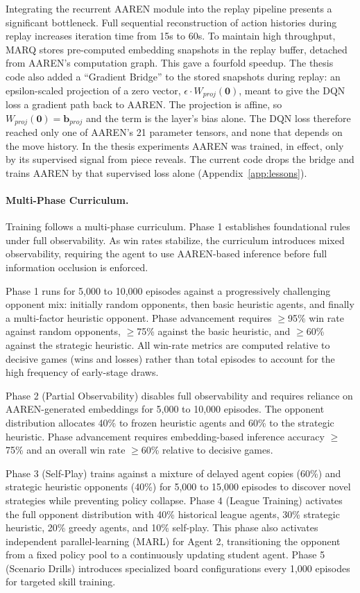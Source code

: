 Integrating the recurrent AAREN module into the replay pipeline presents a significant bottleneck. Full sequential reconstruction of action histories during replay increases iteration time from 15s to 60s. To maintain high throughput, MARQ stores pre-computed embedding snapshots in the replay buffer, detached from AAREN's computation graph. This gave a fourfold speedup. The thesis code also added a ``Gradient Bridge'' to the stored snapshots during replay: an epsilon-scaled projection of a zero vector, $\epsilon \cdot W_{proj}(\mathbf{0})$, meant to give the DQN loss a gradient path back to AAREN. The projection is affine, so $W_{proj}(\mathbf{0}) = \mathbf{b}_{proj}$ and the term is the layer's bias alone. The DQN loss therefore reached only one of AAREN's 21 parameter tensors, and none that depends on the move history. In the thesis experiments AAREN was trained, in effect, only by its supervised signal from piece reveals. The current code drops the bridge and trains AAREN by that supervised loss alone (Appendix~\ref{app:lessons}).

\paragraph{Multi-Phase Curriculum.}
Training follows a multi-phase curriculum. Phase 1 establishes foundational rules under full observability. As win rates stabilize, the curriculum introduces mixed observability, requiring the agent to use AAREN-based inference before full information occlusion is enforced.

Phase 1 runs for 5,000 to 10,000 episodes against a progressively challenging opponent mix: initially random opponents, then basic heuristic agents, and finally a multi-factor heuristic opponent. Phase advancement requires $\geq$95\% win rate against random opponents, $\geq$75\% against the basic heuristic, and $\geq$60\% against the strategic heuristic. All win-rate metrics are computed relative to decisive games (wins and losses) rather than total episodes to account for the high frequency of early-stage draws.

Phase 2 (Partial Observability) disables full observability and requires reliance on AAREN-generated embeddings for 5,000 to 10,000 episodes. The opponent distribution allocates 40\% to frozen heuristic agents and 60\% to the strategic heuristic. Phase advancement requires embedding-based inference accuracy $\geq$75\% and an overall win rate $\geq$60\% relative to decisive games.

Phase 3 (Self-Play) trains against a mixture of delayed agent copies (60\%) and strategic heuristic opponents (40\%) for 5,000 to 15,000 episodes to discover novel strategies while preventing policy collapse. Phase 4 (League Training) activates the full opponent distribution with 40\% historical league agents, 30\% strategic heuristic, 20\% greedy agents, and 10\% self-play. This phase also activates independent parallel-learning (MARL) for Agent 2, transitioning the opponent from a fixed policy pool to a continuously updating student agent. Phase 5 (Scenario Drills) introduces specialized board configurations every 1,000 episodes for targeted skill training.


